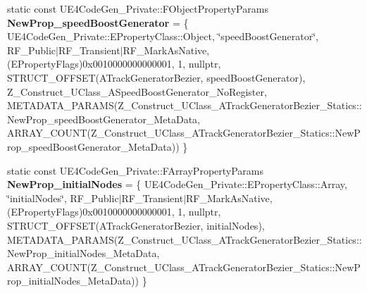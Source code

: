 \begin{DoxyCompactItemize}
\item 
\mbox{\label{struct_z___construct___u_class___a_track_generator_bezier___statics_a7e9f8520e3e62d1f50a875911b155868}} 
static const U\+E4\+Code\+Gen\+\_\+\+Private\+::\+F\+Object\+Property\+Params {\bfseries New\+Prop\+\_\+speed\+Boost\+Generator} = \{ U\+E4\+Code\+Gen\+\_\+\+Private\+::\+E\+Property\+Class\+::\+Object, \char`\"{}speed\+Boost\+Generator\char`\"{}, R\+F\+\_\+\+Public$\vert$R\+F\+\_\+\+Transient$\vert$R\+F\+\_\+\+Mark\+As\+Native, (E\+Property\+Flags)0x0010000000000001, 1, nullptr, S\+T\+R\+U\+C\+T\+\_\+\+O\+F\+F\+S\+E\+T(\+A\+Track\+Generator\+Bezier, speed\+Boost\+Generator), Z\+\_\+\+Construct\+\_\+\+U\+Class\+\_\+\+A\+Speed\+Boost\+Generator\+\_\+\+No\+Register, M\+E\+T\+A\+D\+A\+T\+A\+\_\+\+P\+A\+R\+A\+M\+S(\+Z\+\_\+\+Construct\+\_\+\+U\+Class\+\_\+\+A\+Track\+Generator\+Bezier\+\_\+\+Statics\+::\+New\+Prop\+\_\+speed\+Boost\+Generator\+\_\+\+Meta\+Data, A\+R\+R\+A\+Y\+\_\+\+C\+O\+U\+N\+T(\+Z\+\_\+\+Construct\+\_\+\+U\+Class\+\_\+\+A\+Track\+Generator\+Bezier\+\_\+\+Statics\+::\+New\+Prop\+\_\+speed\+Boost\+Generator\+\_\+\+Meta\+Data)) \}
\item 
\mbox{\label{struct_z___construct___u_class___a_track_generator_bezier___statics_a3e83d5301898c7c9549ef526fc238474}} 
static const U\+E4\+Code\+Gen\+\_\+\+Private\+::\+F\+Array\+Property\+Params {\bfseries New\+Prop\+\_\+initial\+Nodes} = \{ U\+E4\+Code\+Gen\+\_\+\+Private\+::\+E\+Property\+Class\+::\+Array, \char`\"{}initial\+Nodes\char`\"{}, R\+F\+\_\+\+Public$\vert$R\+F\+\_\+\+Transient$\vert$R\+F\+\_\+\+Mark\+As\+Native, (E\+Property\+Flags)0x0010000000000001, 1, nullptr, S\+T\+R\+U\+C\+T\+\_\+\+O\+F\+F\+S\+E\+T(\+A\+Track\+Generator\+Bezier, initial\+Nodes), M\+E\+T\+A\+D\+A\+T\+A\+\_\+\+P\+A\+R\+A\+M\+S(\+Z\+\_\+\+Construct\+\_\+\+U\+Class\+\_\+\+A\+Track\+Generator\+Bezier\+\_\+\+Statics\+::\+New\+Prop\+\_\+initial\+Nodes\+\_\+\+Meta\+Data, A\+R\+R\+A\+Y\+\_\+\+C\+O\+U\+N\+T(\+Z\+\_\+\+Construct\+\_\+\+U\+Class\+\_\+\+A\+Track\+Generator\+Bezier\+\_\+\+Statics\+::\+New\+Prop\+\_\+initial\+Nodes\+\_\+\+Meta\+Data)) \}
\item 
\mbox{\label{struct_z___construct___u_class___a_track_generator_bezier___statics_ae25c127ade70a0c441a3731acd39379b}} 

\end{DoxyCompactItemize}
